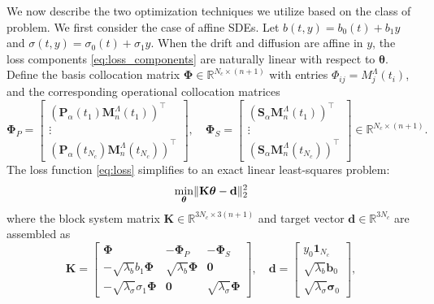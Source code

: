 \documentclass[11pt, a4paper]{article}
\theoremstyle{theoremstyle}
\theoremstyle{definitionstyle}
\DeclarePairedDelimiter{\norm}{\lVert}{\rVert}
\begin{document}
We now describe the two optimization techniques we utilize based on the class of problem. We first consider the case of affine SDEs. Let $b(t, y) = b_0(t) + b_1y$ and $\sigma(t, y) = \sigma_0(t) + \sigma_1y$. When the drift and diffusion are affine in $y$, the loss components \eqref{eq:loss_components} are naturally linear with respect to $\boldsymbol \theta$. Define the basis collocation matrix $\boldsymbol \Phi \in \mathbb R^{N_c \times (n+1)}$ with entries $\Phi_{ij} = M_j^\Lambda(t_i)$, and the corresponding operational collocation matrices
\begin{equation}
    \boldsymbol \Phi_P =
    \begin{bmatrix}
        (\mathbf P_\alpha(t_1)\mathbf M_n^\Lambda(t_1))^\top \\ \vdots \\ (\mathbf P_\alpha(t_{N_c})\mathbf M_n^\Lambda(t_{N_c}))^\top
    \end{bmatrix}, \quad
    \boldsymbol \Phi_S =
    \begin{bmatrix}
        (\mathbf S_\alpha\mathbf M_n^\Lambda(t_1))^\top \\ \vdots \\ (\mathbf S_\alpha\mathbf M_n^\Lambda(t_{N_c}))^\top
    \end{bmatrix} \in \mathbb R^{N_c \times (n+1)}.
\end{equation}
The loss function \eqref{eq:loss} simplifies to an exact linear least-squares problem:
\begin{equation}
    \min_{\boldsymbol \theta} \norm{\mathbf K \boldsymbol \theta - \mathbf d}_2^2
\end{equation}
where the block system matrix $\mathbf K \in \mathbb R^{3N_c \times 3(n+1)}$ and target vector $\mathbf d \in \mathbb R^{3N_c}$ are assembled as
\begin{equation}\label{eq:block_system}
    \mathbf K =
    \begin{bmatrix}
        \boldsymbol \Phi & -\boldsymbol \Phi_P & -\boldsymbol \Phi_S \\
        -\sqrt{\lambda_b}b_1\boldsymbol \Phi & \sqrt{\lambda_b}\boldsymbol \Phi & \mathbf 0 \\
        -\sqrt{\lambda_\sigma}\sigma_1 \boldsymbol \Phi & \mathbf 0 & \sqrt{\lambda_\sigma}\boldsymbol \Phi
    \end{bmatrix}, \quad
    \mathbf d =
    \begin{bmatrix}
        y_0\mathbf 1_{N_c} \\ \sqrt{\lambda_b}\mathbf b_0 \\ \sqrt{\lambda_\sigma} \boldsymbol \sigma_0
    \end{bmatrix},
\end{equation}
\end{document}
